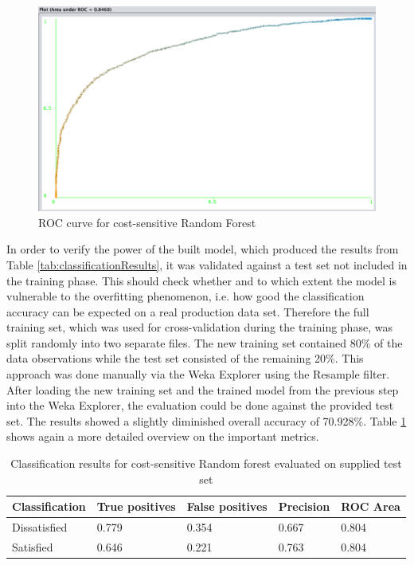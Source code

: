 \begin{figure}
	\centering
	\includegraphics[width=1.0\textwidth]{img/rocResultRF.png}
	\caption{ROC curve for cost-sensitive Random Forest}
	\label{fig:rocCurve}
\end{figure}

In order to verify the power of the built model, which produced the results from Table \ref{tab:classificationResults}, it was validated against a test set not included in the training phase. This should check whether and to which extent the model is vulnerable to the overfitting phenomenon, i.e. how good the classification accuracy can be expected on a real production data set. Therefore the full training set, which was used for cross-validation during the training phase, was split randomly into two separate files. The new training set contained 80\% of the data observations while the test set consisted of the remaining 20\%. This approach was done manually via the Weka Explorer using the Resample filter. After loading the new training set and the trained model from the previous step into the Weka Explorer, the evaluation could be done against the provided test set. The results showed a slightly diminished overall accuracy of 70.928\%. Table \ref{tab:testResults} shows again a more detailed overview on the important metrics.

\begin{table}[]
	\centering
	\begin{tabular}{|l|l|l|l|l|}
		\hline
		\textbf{Classification} & \textbf{True positives} & \textbf{False positives} & \textbf{Precision} & \textbf{ROC Area} \\ \hline
		Dissatisfied            & 0.779                   & 0.354                    & 0.667              & 0.804             \\ \hline
		Satisfied               & 0.646                   & 0.221                    & 0.763                & 0.804             \\ \hline
	\end{tabular}
	\caption{Classification results for cost-sensitive Random forest evaluated on supplied test set}
	\label{tab:testResults}
\end{table}

